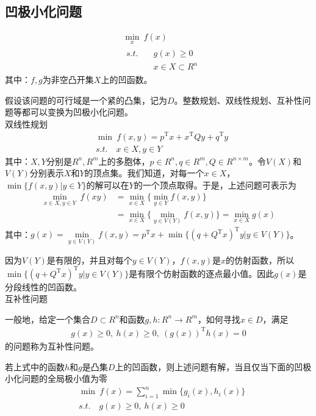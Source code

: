     \subsection{凹极小化问题}
        \begin{align*}
       & \mathop{\min}\limits_{x}\  f(x)\\
       & \begin{aligned}
       s.t.\quad &g(x)\geqslant 0\\
       & x\in X\subset R^n
       \end{aligned}
        \end{align*}
        其中：$f,g$为非空凸开集$X$上的凹函数。
        \par
        假设该问题的可行域是一个紧的凸集，记为$D$。整数规划、双线性规划、互补性问题等都可以变换为凹极小化问题。\\
        双线性规划
        \begin{align*}
       & \mathop{\min}\  f(x,y)=p^\mathrm{T} x+x^\mathrm{T} Qy+q^\mathrm{T} y\\
       & s.t.\quad x\in X,y\in Y
        \end{align*}
        其中：$X,Y$分别是$R^n,R^m$上的多胞体，$p\in R^n,q\in R^m,Q\in R^{n\times m}$。令$V(X)$和$V(Y)$分别表示$X$和$Y$的顶点集。我们知道，对每一个$x\in X$，${\min}\{f(x,y)|y\in Y\}$的解可以在$Y$的一个顶点取得。于是，上述问题可表示为
        \begin{align*}
        \mathop{\min}\limits_{x\in X,y\in Y}\  f(xy)&=\mathop{\min}\limits_{x\in X}\{\mathop{\min}\limits_{y\in Y}f(x,y)\}\\
        & =\mathop{\min}\limits_{x\in X}\{\mathop{\min}\limits_{y\in {V(Y)}}f(x,y)\}=\mathop{\min}\limits_{x\in X}g(x)
        \end{align*}
        其中：$g(x)=\mathop{\min}\limits_{y\in {V(Y)}}f(x,y)=p^\mathrm{T} x+{\min}\{(q+Q^\mathrm{T} x)^\mathrm{T} y|y\in V(Y)\}$。
        \par
        因为$V(Y)$是有限的，并且对每个$y \in V(Y)$，$f(x,y)$是$x$的仿射函数，所以${\min}\{(q+Q^\mathrm{T} x)^\mathrm{T} y|y\in V(Y)\}$是有限个仿射函数的逐点最小值。因此$g(x)$是分段线性的凹函数。\\
        互补性问题
        \par
        一般地，给定一个集合$D\subset R^n$和函数$g,h:R^n\to R^m$，如何寻找$x\in D$，满足
        \begin{align*}
        g(x)\geqslant 0,\ h(x)\geqslant 0,\ (g(x))^\mathrm{T} h(x)=0
        \end{align*}
        的问题称为互补性问题。
        \begin{proposition}
        若上式中的函数$h$和$g$是凸集$D$上的凹函数，则上述问题有解，当且仅当下面的凹极小化问题的全局极小值为零
        \begin{align*}
       & \mathop{\min}\  f(x)=\mathop{\sum}\limits_{i=1}^n\min \{g_i(x),h_i(x)\}\\
       & s.t.\quad g(x)\geqslant 0,\ h(x)\geqslant 0
        \end{align*}
        \end{proposition}

